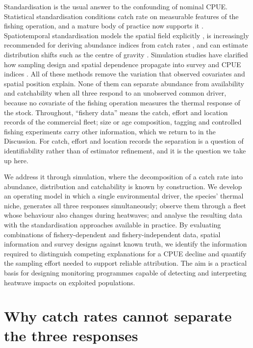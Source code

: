 \documentclass[11pt,a4paper]{article}
\begin{document}
Standardisation is the usual answer to the confounding of nominal CPUE. Statistical standardisation conditions catch rate on measurable features of the fishing operation, and a mature body of practice now supports it \citep{maunder2004,hoyle2024}. Spatiotemporal standardisation models the spatial field explicitly \citep{thorson2015,thorson2017,thorson2019}, is increasingly recommended for deriving abundance indices from catch rates \citep{maunder2020,thorson2020}, and can estimate distribution shifts such as the centre of gravity \citep{thorson2016a}. Simulation studies have clarified how sampling design and spatial dependence propagate into survey and CPUE indices \citep{fuster2024}. All of these methods remove the variation that observed covariates and spatial position explain. None of them can separate abundance from availability and catchability when all three respond to an unobserved common driver, because no covariate of the fishing operation measures the thermal response of the stock. Throughout, ``fishery data'' means the catch, effort and location records of the commercial fleet; size or age composition, tagging and controlled fishing experiments carry other information, which we return to in the Discussion. For catch, effort and location records the separation is a question of identifiability rather than of estimator refinement, and it is the question we take up here.

We address it through simulation, where the decomposition of a catch rate into abundance, distribution and catchability is known by construction. We develop an operating model in which a single environmental driver, the species' thermal niche, generates all three responses simultaneously; observe them through a fleet whose behaviour also changes during heatwaves; and analyse the resulting data with the standardisation approaches available in practice. By evaluating combinations of fishery-dependent and fishery-independent data, spatial information and survey designs against known truth, we identify the information required to distinguish competing explanations for a CPUE decline and quantify the sampling effort needed to support reliable attribution. The aim is a practical basis for designing monitoring programmes capable of detecting and interpreting heatwave impacts on exploited populations.

\section{Why catch rates cannot separate the three responses}
\end{document}
